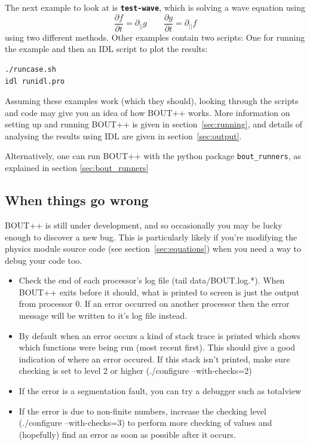 \documentclass[12pt]{article}
\newcommand{\file}[1]{\texttt{\bf #1}}
\newcommand{\deriv}[2]{\ensuremath{\frac{\partial #1}{\partial #2}}}
\begin{document}
The next example to look at is \file{test-wave}, which is solving a wave equation using
\[
\deriv{f}{t} = \partial_{||} g \qquad \deriv{g}{t} = \partial_{||} f 
\]
using two different methods. Other examples contain two scripts: One for running the example and then an IDL script
to plot the results:
\begin{verbatim}
./runcase.sh
idl runidl.pro
\end{verbatim}

Assuming these examples work (which they should), looking through the scripts and code
may give you an idea of how BOUT++ works. More information on setting up and running BOUT++ is given
in section~\ref{sec:running}, and details of analysing the results using IDL are given in
section~\ref{sec:output}.

Alternatively, one can run BOUT++ with the python package 
\lstinline!bout_runners!, as explained in section \ref{sec:bout_runners}

\subsection{When things go wrong}

BOUT++ is still under development, and so occasionally you may be lucky
enough to discover a new bug. This is particularly likely if you're modifying
the physics module source code (see section~\ref{sec:equations}) when you
need a way to debug your code too.

\begin{itemize}
\item Check the end of each processor's log file (tail data/BOUT.log.*). When BOUT++ exits before
it should, what is printed to screen is just the output from processor 0.
If an error occurred on another processor then the error message will be written to it's log file instead.
\item By default when an error occurs a kind of stack trace is printed which shows which functions
were being run (most recent first). This should give a good indication of where an error occured.
If this stack isn't printed, make sure checking is set to level 2 or higher (./configure --with-checks=2)
\item If the error is a segmentation fault, you can try a debugger such as totalview
\item If the error is due to non-finite numbers, increase the checking level
(./configure --with-checks=3) to perform more checking of values
and (hopefully) find an error as soon as possible after it occurs.
\end{itemize}
\end{document}
